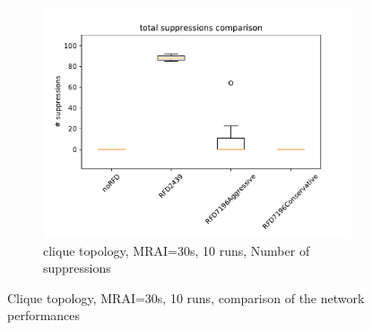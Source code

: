 \begin{figure}[h]
\begin{subfigure}[b]{0.3\textwidth}
         \label{fig:RFD_MRAI30_convTime}
     \end{subfigure}
     \hfill
     \begin{subfigure}[b]{0.3\textwidth}
         \centering
         \includegraphics[width=\textwidth]{images/RFD/clique/clique_rfd_comparison_suppressions_boxplot.pdf}
         \caption{clique topology, MRAI=30s, 10 runs, Number of suppressions}
         \label{fig:RFD_MRAI30_suppressions}
     \end{subfigure}
        \caption{Clique topology, MRAI=30s, 10 runs, comparison of the network performances}
        \label{fig:RFD_MRAI30}
\end{figure}


\clearpage

